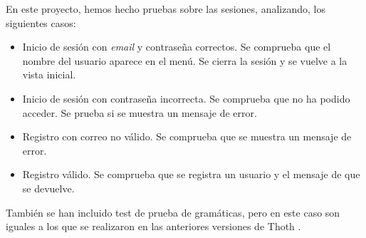 En este proyecto, hemos hecho pruebas sobre las sesiones, analizando, los siguientes casos:

\begin{itemize}
\item Inicio de sesión con \emph{email} y contraseña correctos. Se comprueba que el nombre del usuario aparece en el menú. Se cierra la sesión y se vuelve a la vista inicial.
\item Inicio de sesión con contraseña incorrecta. Se comprueba que no ha podido acceder. Se prueba si se muestra un mensaje de error.
\item Registro con correo no válido. Se comprueba que se muestra un mensaje de error. 
\item Registro válido. Se comprueba que se registra un usuario y el mensaje de que se devuelve.

\end{itemize}

También se han incluido test de prueba de gramáticas, pero en este caso son iguales a los que se realizaron en las anteriores versiones de Thoth \cite{thothv2}. 